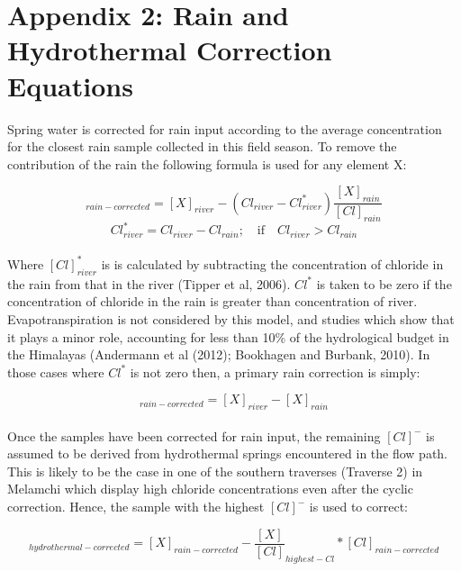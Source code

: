 \section*{Appendix 2: Rain and Hydrothermal Correction Equations}


Spring water is corrected for rain input according to the average concentration for the closest rain sample collected in this field season. To remove the contribution of the rain the following formula is used for any element X:

\begin{equation}
    [X]_{rain-corrected}  = [X]_{river} - (Cl_{river} - Cl^*_{river})\frac{[X]_{rain}}{[Cl]_{rain}}
\end{equation}
\begin{equation}
    Cl^*_{river} = Cl_{river} - Cl_{rain}; \quad \text{if} \quad Cl_{river} > Cl_{rain}
\end{equation}\\
    

Where $[Cl]^*_{river}$ is is calculated by subtracting the concentration of chloride in the rain from that in the river (Tipper et al, 2006). $Cl^{*}$ is taken to be zero if the concentration of chloride in the rain is greater than concentration of river. Evapotranspiration is not considered by this model, and studies which show that it plays a minor role, accounting for less than 10\% of the hydrological budget in the Himalayas (Andermann et al (2012); Bookhagen and Burbank, 2010). In those cases where $Cl^*$ is not zero then, a primary rain correction is simply:

\begin{equation}
[X]_{rain-corrected}  = [X]_{river} - [X]_{rain}
\end{equation}\\

Once the samples have been corrected for rain input, the remaining $[Cl]^{-}$ is assumed to be derived from hydrothermal springs encountered in the flow path. This is likely to be the case in one of the southern traverses (Traverse 2) in Melamchi which display high chloride concentrations even after the cyclic correction. Hence, the sample with the highest $[Cl]^{-}$ is used to correct:

\begin{equation}
[X]_{hydrothermal-corrected}  = [X]_{rain-corrected} - \frac{[X]}{[Cl]}_{highest-Cl} * [Cl]_{rain-corrected}
\end{equation}\\

